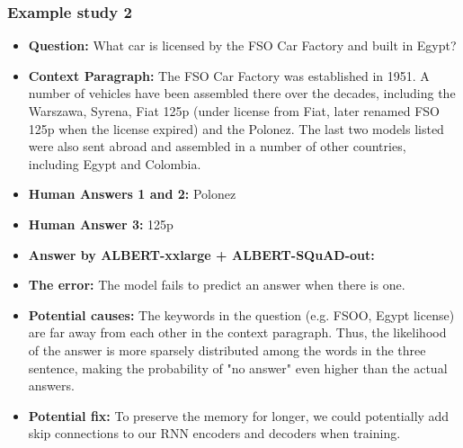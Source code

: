 \documentclass{article}
\begin{document}
\subsubsection{Example study 2}
\begin{itemize}
    \item \textbf{Question:} What car is licensed by the FSO Car Factory and built in Egypt?
    \item \textbf{Context Paragraph:} The FSO Car Factory was established in 1951. A number of vehicles have been assembled there over the decades, including the Warszawa, Syrena, Fiat 125p (under license from Fiat, later renamed FSO 125p when the license expired) and the Polonez. The last two models listed were also sent abroad and assembled in a number of other countries, including Egypt and Colombia. 
    \item \textbf{Human Answers 1 and 2:} Polonez
    \item \textbf{Human Answer 3:} 125p
    \item \textbf{Answer by ALBERT-xxlarge + ALBERT-SQuAD-out:} 
\item \textbf{The error:} The model fails to predict an answer when there is one.
    \item \textbf{Potential causes:} The keywords in the question (e.g. FSOO, Egypt license) are far away from each other in the context paragraph. Thus, the likelihood of the answer is more sparsely distributed among the words in the three sentence, making the probability of "no answer" even higher than the actual answers.
    \item \textbf{Potential fix:} To preserve the memory for longer, we could potentially add skip connections to our RNN encoders and decoders when training.
\end{itemize}
\end{document}
